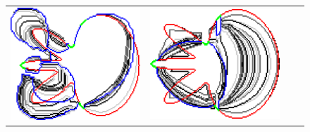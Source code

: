 \begin{figure}
\begin{tabular}{cccc}
\includegraphics[scale=0.2]{figures/chapter9/constrained-elastica/localsearch/flower-1/len_pen-0.0002/radius-15/nc-4/h1.0/summary.pdf} &
\includegraphics[scale=0.25]{figures/chapter9/constrained-elastica/graphflow/flower-1/len_pen-0.002/radius-15/N-1/h1.0/summary.pdf} &

\end{tabular}
\end{figure}
